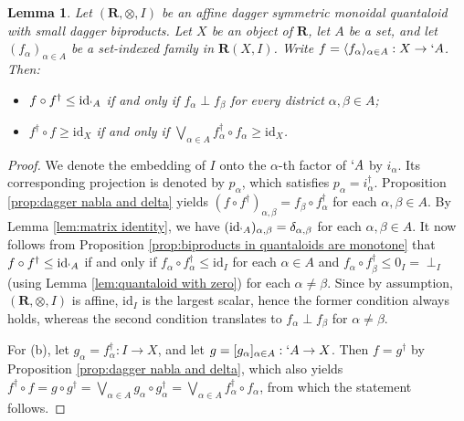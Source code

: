 \documentclass[12pt]{tac}
\newtheorem{lemma}[theorem]{Lemma}
\theoremstyle{definition}
\theoremstyle{remark}
\newcommand{\<}{\langle}
\renewcommand{\>}{\rangle}
\renewcommand{\:}{\colon}
\newcommand{\id}{\mathrm{id}}
\begin{document}
\begin{lemma}\label{lem:characterization functions to IoplusI}
    Let $(\mathbf R,\otimes,I)$ be an affine dagger symmetric monoidal  quantaloid with small dagger biproducts. Let $X$ be an object of $\mathbf R$, let $A$ be a set, and let $(f_\alpha)_{\alpha\in A}$ be a set-indexed family in $\mathbf R(X,I)$. Write $f=\langle f_\alpha\rangle_{\alpha\in A}:X\to `{A}$. Then:
    \begin{itemize}
        \item[(a)] $f\circ f^\dag\leq\id_{`A}$ if and only if $f_\alpha\perp f_\beta$ for every district $\alpha,\beta\in A$;
        \item[(b)] $f^\dag\circ f\geq\id_X$ if and only if $\bigvee_{\alpha\in A}f_\alpha^\dag\circ f_\alpha\geq\id_X$. 
    \end{itemize}
\end{lemma}
\begin{proof}
We denote the embedding of $I$ onto the $\alpha$-th factor of $`A$ by $i_\alpha$. Its corresponding projection is denoted by $p_\alpha$, which satisfies  $p_\alpha=i_\alpha^\dag$.  Proposition \ref{prop:dagger nabla and delta} yields $(f\circ f^\dag)_{\alpha,\beta}=f_\beta\circ f_\alpha^\dag$ for each $\alpha,\beta\in A$.
By Lemma \ref{lem:matrix identity}, we have $(\id_{`A})_{\alpha,\beta}=\delta_{\alpha,\beta}$ for each $\alpha,\beta\in A$. 
It now follows from Proposition \ref{prop:biproducts in quantaloids are monotone} that $f\circ f^\dag\leq\id_{`A}$ if and only if 
$f_\alpha\circ f^\dag_\alpha\leq \id_I$ for each $\alpha\in A$ and $f_\alpha\circ f^\dag_\beta\leq 0_I=\perp_I$ (using Lemma \ref{lem:quantaloid with zero}) for each $\alpha\neq\beta$. Since by assumption, $(\mathbf R,\otimes,I)$ is affine, $\id_I$ is the largest scalar, hence the former condition always holds, whereas the second condition translates to $f_\alpha\perp f_\beta$ for $\alpha\neq\beta$.

For (b), let $g_\alpha=f_\alpha^\dag:I\to X$, and let $g=[g_\alpha]_{\alpha\in A}:`A\to X$. Then $f=g^\dag$ by Proposition \ref{prop:dagger nabla and delta}, which also yields $f^\dag\circ f=g\circ g^\dag=\bigvee_{\alpha\in A}g_\alpha\circ g_\alpha^\dag=\bigvee_{\alpha\in A}f_\alpha^\dag\circ f_\alpha$,
from which the statement follows.
\end{proof}
\end{document}
